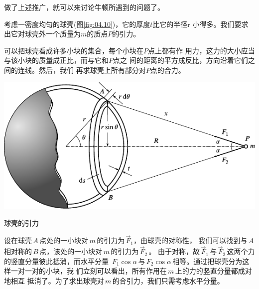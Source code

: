 做了上述推广，就可以来讨论牛顿所遇到的问题了。

考虑一密度均匀的球壳(图\ref{fig:04.10})，它的厚度$ t $比它的半径$  $r
小得多。我们要求出它对球壳外一个质量为$ m $的质点$ P $的引力。

可以把球壳看成许多小块的集合，每个小块在$ P $点上都有作
用力，这力的大小应当与该小块的质量成正比，而与它和$ P $点之
间的距离的平方成反比，方向沿着它们之间的连线。然后，我们
再求球壳上所有部分对$ P $点的合力。
\begin{figurex}
  \centering
  \includegraphics{figure/fig04.10}
  \caption{球壳的引力}
  \label{fig:04.10}
\end{figurex}\vspace{-0.5em}

设在球壳\,$ A $\,点处的一小块对\,$ m $\,的引力为\,$ \vec{F} _ { 1 } $，由球壳的对称性，
我们可以找到与\,$ A $\,相对称的\,$ B $\,点，该处的一小块对\,$ m $\,的引力为\,$ \vec{F} _ { 2 } $\,。
由于对称，故\,$ \vec{F} _ { 1 } $\,与\,$ \vec{F} _ { 2 } $\,这两个力的竖直分量彼此抵消，而水平分量
\,$ F _ { 1 } \cos \alpha $\,与\,$ F _ { 2 } \cos \alpha $\,相等。通过把球壳分为这样一对一对的小块，我
们立刻可以看出，所有作用在\,$ m $\,上的力的竖直分量都成对地相互
抵消了。为了求出球壳对\,$ m $\,的合引力，我们只需考虑水平分量。

